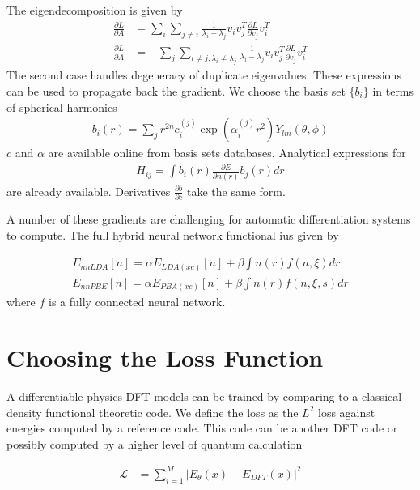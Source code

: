 \documentclass[book.tex]{subfiles}
\begin{document}
The eigendecomposition is given by
\begin{align}
\frac{\partial L}{\partial A} &= \sum_i \sum_{j \neq i} \frac{1}{\lambda_i-\lambda_j}v_i v_j^T \frac{\partial L}{\partial v_j} v_i^T \\
\frac{\partial L}{\partial A} &= - \sum_j \sum_{i \neq j, \lambda_i \neq \lambda_j} \frac{1}{\lambda_i - \lambda_j} v_iv_j^T \frac{\partial L}{\partial v_j} v_i^T
\end{align}
The second case handles degeneracy of duplicate eigenvalues. These expressions can be used to propagate back the gradient. We choose the basis set $\{b_i\}$ in terms of spherical harmonics
\begin{align}
b_i(r) = \sum_j r^{2n}c_i^{(j)} \exp(\alpha_i^{(j)} r^2) Y_{lm}(\theta, \phi)
\end{align}
$c$ and $\alpha$ are available online from basis sets databases. Analytical expressions for 
\begin{align}
H_{ij} = \int b_i(r) \frac{\partial E}{\partial n(r)} b_j(r) dr 
\end{align}
are already available. Derivatives $\frac{\partial b}{\partial c}$ take the same form.

A number of these gradients are challenging for automatic differentiation systems to compute. The full hybrid neural network functional ius given by

\begin{align}
    E_{nnLDA}[n] = \alpha E_{LDA(xc)}[n] + \beta \int n(r) f(n, \xi) dr \\
    E_{nnPBE}[n] = \alpha E_{PBA(xc)}[n] + \beta \int n(r) f(n, \xi, s) dr
\end{align}
where $f$ is a fully connected neural network.

\section{Choosing the Loss Function}

A differentiable physics DFT models can be trained by comparing to a classical density functional theoretic code. We define the loss as the $L^2$ loss against energies computed by a reference code. This code can be another DFT code or possibly computed by a higher level of quantum calculation

\begin{align}
\mathcal{L} &= \sum_{i=1}^M |E_{\theta}(x) - E_{DFT}(x)|^2
\end{align}

\end{document}
